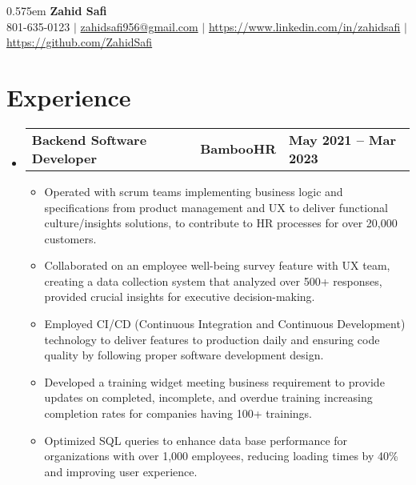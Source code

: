 \documentclass[letterpaper,11pt]{article}
\def\namespaceskip{0.575em}
\begin{document}
\begin{center}
    \spaceskip \namespaceskip \relax
  \textbf{\Huge{Zahid Safi}} \\ \vspace{1pt}
    \small 801-635-0123 $|$ \href{mailto:zahidsafi956@gmail.com}{{zahidsafi956@gmail.com}} $|$ 
    \href{https://www.linkedin.com/in/zahidsafi}{{https://www.linkedin.com/in/zahidsafi}} $|$
    \href{https://github.com/ZahidSafi}{{https://github.com/ZahidSafi}} 
\end{center}


\section{\textbf{Experience}}
\begin{itemize}[leftmargin=0.05in, label={}]
	\item{
	            \begin{tabu} {X[l] X[c] X[r]}
		            \textbf{Backend Software Developer} & \textbf{BambooHR} & \textbf{May 2021 -- Mar 2023} \\
	            \end{tabu}
	            \begin{itemize}[label=$\bullet$]
		            \item{Operated with scrum teams implementing business logic and specifications from product management
					and UX
					to deliver functional culture/insights solutions, to contribute to HR processes for over 20,000 customers.}
		            \item{Collaborated on an employee well-being survey feature with UX team, creating a data collection
					system that analyzed over 500+ responses, provided crucial insights for executive decision-making.}
		            \item {Employed CI/CD (Continuous Integration and Continuous Development) technology to deliver
					features to production daily and ensuring code quality by following proper software development design.}
		            \item{Developed a training widget meeting business requirement to provide updates on completed,
					incomplete, and overdue training increasing completion rates for companies having 100+ trainings.}
		            \item{Optimized SQL queries to enhance data base performance for organizations with over 1,000 employees,
					reducing loading times by 40\% and improving user experience.}
	            \end{itemize}
	      }


\end{itemize}
\end{document}
